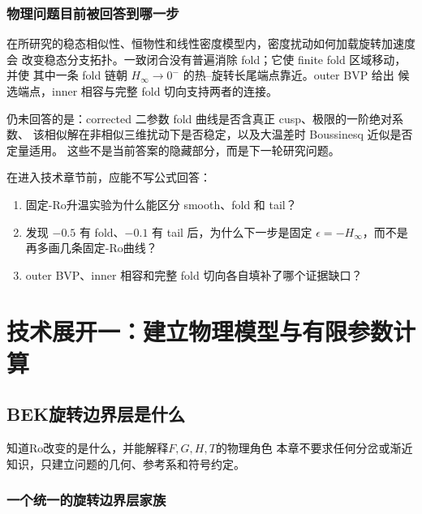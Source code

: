 \documentclass[UTF8,zihao=-4,openany]{ctexbook}
\newcommand{\eps}{\epsilon}
\newcommand{\Ro}{\mathrm{Ro}}
\begin{document}
\section{物理问题目前被回答到哪一步}

\begin{keyresult}[：当前可支持的回答]
在所研究的稳态相似性、恒物性和线性密度模型内，密度扰动如何加载旋转加速度会
改变稳态分支拓扑。一致闭合没有普遍消除 fold；它使 finite fold 区域移动，并使
其中一条 fold 链朝 $H_\infty\to0^-$ 的热--旋转长尾端点靠近。outer BVP 给出
候选端点，inner 相容与完整 fold 切向支持两者的连接。
\end{keyresult}

仍未回答的是：corrected 二参数 fold 曲线是否含真正 cusp、极限的一阶绝对系数、
该相似解在非相似三维扰动下是否稳定，以及大温差时 Boussinesq 近似是否定量适用。
这些不是当前答案的隐藏部分，而是下一轮研究问题。

\enlargethispage{4\baselineskip}
\begin{checkpoint}
在进入技术章节前，应能不写公式回答：
\begin{enumerate}
  \item 固定-$\Ro$升温实验为什么能区分 smooth、fold 和 tail？
  \item 发现 $-0.5$ 有 fold、$-0.1$ 有 tail 后，为什么下一步是固定
  $\eps=-H_\infty$，而不是再多画几条固定-$\Ro$曲线？
  \item outer BVP、inner 相容和完整 fold 切向各自填补了哪个证据缺口？
\end{enumerate}
\end{checkpoint}

\part{技术展开一：建立物理模型与有限参数计算}

\chapter{BEK旋转边界层是什么}\label{ch:physical}

\begin{learninggoal}{知道$\Ro$改变的是什么，并能解释$F,G,H,T$的物理角色}
本章不要求任何分岔或渐近知识，只建立问题的几何、参考系和符号约定。
\end{learninggoal}

\section{一个统一的旋转边界层家族}
\end{document}
